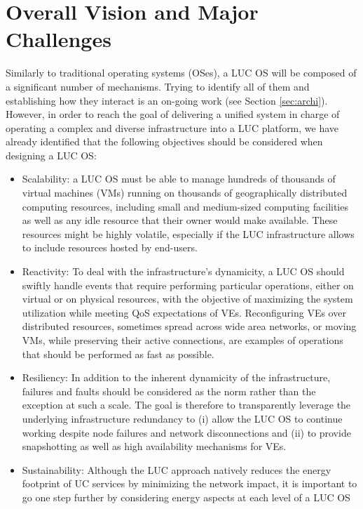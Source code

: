 \section{Overall Vision and Major Challenges\label{sec:challenges}}

Similarly to traditional operating systems (OSes), a LUC OS will be composed of a
significant number of mechanisms. Trying to identify all of them and establishing how they
interact is an on-going work (see Section \ref{sec:archi}).  However, in order to reach
the goal of delivering a unified system in charge of operating a complex and diverse
infrastructure into a LUC platform, we have already identified that the following
objectives should be considered when designing a LUC OS:
\begin{itemize} 
\item Scalability: a LUC OS must be able to manage hundreds of
  thousands of virtual machines (VMs) running on thousands of 
  geographically distributed computing resources, including small and
  medium-sized computing facilities as well as any idle resource that their owner would make available. These resources might be
  highly volatile, especially if the LUC infrastructure allows to include resources hosted by
  end-users.
\item Reactivity: To deal with the infrastructure's dynamicity, a LUC OS
  should swiftly handle events that require performing particular
  operations, either on virtual or on physical resources, with the
  objective of maximizing the system utilization while meeting QoS expectations of VEs. 
  Reconfiguring  VEs over distributed resources, sometimes spread across wide area networks, or moving VMs, 
  while preserving their active connections, are examples of operations that should be performed as fast as possible.
\item Resiliency: In addition to the inherent dynamicity of the
  infrastructure, failures and faults should be considered as the norm rather than the
exception at such a scale. The goal is therefore to transparently leverage the
underlying infrastructure redundancy to (i) allow the LUC OS to continue
working despite node failures and network disconnections and (ii) to provide
snapshotting as well as high availability mechanisms for VEs.
\item Sustainability: Although the LUC approach natively reduces the energy
footprint of UC services by minimizing the network impact, it is important to go one
step further by considering energy aspects at each level of a LUC OS

\end{itemize}

